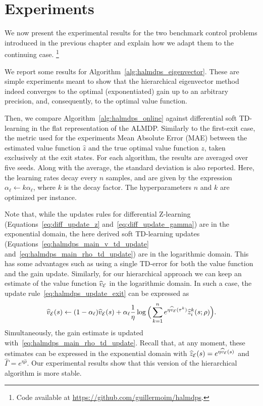 \section{Experiments}

We now present the experimental results for the two benchmark control problems introduced in the previous chapter and explain how we adapt them to the continuing case. \footnote{Code available at \url{https://github.com/guillermoim/halmdps}.}

We report some results for Algorithm~\ref{alg:halmdps_eigenvector}. These are  simple experiments meant to show that the hierarchical eigenvector method indeed converges to the optimal (exponentiated) gain up to an arbitrary precision, and, consequently, to the optimal value function.

Then, we compare Algorithm~\ref{alg:halmdps_online} against differential soft TD-learning in the flat representation of the ALMDP. Similarly to the first-exit case, the metric used for the experiments Mean Absolute Error (MAE) between the estimated value function $\widehat z$ and the true optimal value function $z$, taken exclusively at the exit states. For each algorithm, the results are averaged over five seeds. Along with the average, the standard deviation is also reported. Here, the learning rates decay every $n$ samples, and are given by the expression $\alpha_\ell \leftarrow k \alpha_\ell$, where $k$ is the decay factor. The hyperparameters $n$ and $k$ are optimized per instance. 

Note that, while the updates rules for differential Z-learning (Equations~\eqref{eq:diff_update_z} and~\eqref{eq:diff_update_gamma}) are in the exponential domain, the here derived soft TD-learning updates (Equations~\eqref{eq:halmdps_main_v_td_update} and~\eqref{eq:halmdps_main_rho_td_update}) are in the logarithmic domain. This has some advantages such as using a single TD-error for both the value function and the gain update. Similarly, for our hierarchical approach we can keep an estimate of the value function $\widehat v_{\mathcal{E}}$ in the logarithmic domain. In such a case, the update rule~\eqref{eq:halmdps_update_exit} can be expressed as 
\begin{equation*}
    \widehat v_{\mathcal{E}}(s)\gets (1-\alpha_\ell) \widehat v_{\mathcal{E}}(s) + \alpha_\ell\frac{1}{\eta} \log\Big(\sum_{k=1}^n e^{\eta \widehat  v_{\mathcal{E}}(\tau^k)} \widehat z_i^k(s;\rho)\Big).
\end{equation*}
Simultaneously, the gain estimate is updated with~\eqref{eq:halmdps_main_rho_td_update}. Recall that, at any moment, these estimates can be expressed in the exponential domain with $\widehat z_{\mathcal{E}}(s)=e^{\eta\widehat v_{\mathcal{E}}(s)}$ and $\widehat\Gamma=e^{\eta\widehat\rho}$. Our experimental results show that this version of the hierarchical algorithm is more stable.

